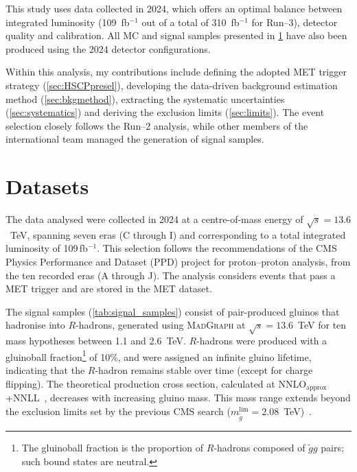 This study uses data collected in 2024, which offers an optimal balance between integrated luminosity (109~fb$^{-1}$ out of a total of 310~fb$^{-1}$ for Run--3), detector quality and calibration. All MC and signal samples presented in \cref{sec:dataset} have also been produced using the 2024 detector configurations.

Within this analysis, my contributions include defining the adopted MET trigger strategy (\cref{sec:HSCPpresel}), developing the data-driven background estimation method (\cref{sec:bkgmethod}), extracting the systematic uncertainties (\cref{sec:systematics}) and deriving the exclusion limits (\cref{sec:limits}). The event selection closely follows the Run--2 analysis, while other members of the international team managed the generation of signal samples.



\section{Datasets}
\label{sec:dataset}

The data analysed were collected in 2024 at a centre-of-mass energy of $\sqrt{s}=13.6$~TeV, spanning seven eras (C through I) and corresponding to a total integrated luminosity of 109\,fb$^{-1}$. This selection follows the recommendations of the CMS Physics Performance and Dataset (PPD) project for proton--proton analysis, from the ten recorded eras (A through J). The analysis considers events that pass a MET trigger and are stored in the MET dataset.

The signal samples (\cref{tab:signal_samples}) consist of pair-produced gluinos that hadronise into $R$-hadrons, generated using \textsc{MadGraph} at $\sqrt{s}=13.6$~TeV for ten mass hypotheses between 1.1 and 2.6~TeV. $R$-hadrons were produced with a gluinoball fraction\footnote{The gluinoball fraction is the proportion of $R$-hadrons composed of $\tilde{g}g$ pairs; such bound states are neutral.} of 10\%, and were assigned an infinite gluino lifetime, indicating that the $R$-hadron remains stable over time (except for charge flipping). The theoretical production cross section, calculated at NNLO$_\text{approx}$+NNLL~\cite{10.21468/SciPostPhysCore.7.4.072}, decreases with increasing gluino mass. This mass range extends beyond the exclusion limits set by the previous CMS search ($m_{\tilde{g}}^\textrm{lim}=2.08$~TeV)~\cite{HSCP_Run2}.

